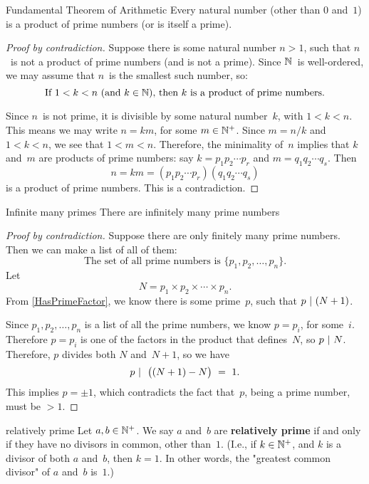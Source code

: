 \documentclass[../MATH-2000-Notes.tex]{subfiles}
\begin{document}
\begin{Theorem}{Fundamental Theorem of Arithmetic}
    Every natural number \textup(other than $0$ and~$1$\textup) is a product of prime numbers \textup(or is itself a prime\textup).
\end{Theorem}
    
\begin{proof}[Proof by contradiction]
    Suppose there is some natural number $n > 1$, such that $n$~is not a product of prime numbers (and is not a prime). Since $\mathbb{N}$~is well-ordered, we may assume that $n$~is the smallest such number, so:
        $$ \text{If $1 < k < n$ (and $k \in \mathbb{N}$), then $k$~is a product of prime numbers} .$$
    
    Since $n$~is not prime, it is divisible by some natural number~$k$, with $1 < k < n$. This means we may write $n = km$, for some $m \in \mathbb{N}^+$. Since $m = n/k$ and $1 < k < n$, we see that $1 < m < n$. Therefore, the minimality of~$n$ implies that $k$ and~$m$ are products of prime numbers: say $k = p_1 p_2 \cdots p_r$ and $m = q_1 q_2 \cdots q_s$. Then
        $$ n = km = (p_1 p_2 \cdots p_r)(q_1 q_2 \cdots q_s) $$
    is a product of prime numbers. This is a contradiction.
\end{proof}


\begin{Corollary}
    {Infinite many primes}
    There are infinitely many prime numbers
\end{Corollary}


\begin{proof}[Proof by contradiction]
    Suppose there are only finitely many prime numbers. Then we can make a list of all of them: 
        $$ \text{The set of all prime numbers is $\{p_1,p_2,\ldots,p_n\}$.} $$
    Let 
        $$ N = p_1\times p_2 \times \cdots \times p_n .$$
    From \ref{HasPrimeFactor}, we know there is some prime~$p$, such that $p \ |\  (N+1)$. 
    
    Since $p_1,p_2,\ldots,p_n$ is a list of all the prime numbers, we know $p = p_i$, for some~$i$. Therefore $p = p_i$ is one of the factors in the product that defines~$N$, so $p \ |\  N$. Therefore, $p$ divides both $N$ and~$N+1$, so we have
        $$ p \ |\  \ \bigl( (N+1) - N\bigr) \ = \ 1 .$$
    This implies $p = \pm 1$, which contradicts the fact that~$p$, being a prime number, must be $> 1$.
\end{proof}


\begin{Definition}
    {relatively prime}
    Let $a,b \in \mathbb{N}^+$. We say $a$ and~$b$ are \textbf{relatively prime} if and only if they have no divisors in common, other than~$1$. (I.e., if $k \in  \mathbb{N}^+$, and $k$ is a divisor of both $a$ and~$b$, then $k = 1$. In other words, the "greatest common divisor" of $a$ and~$b$ is~$1$.)
\end{Definition}
\end{document}
